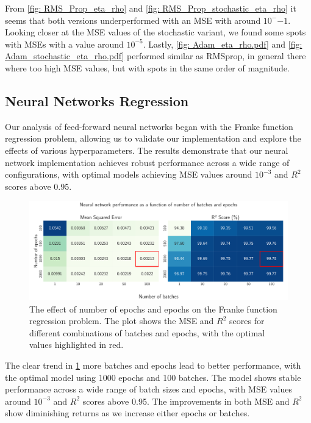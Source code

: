 From \cref{fig: RMS_Prop_eta_rho} and \cref{fig: RMS_Prop_stochastic_eta_rho} it seems that both versions underperformed with an MSE with around \( 10^-{-1} \). Looking closer at the MSE values of the stochastic variant, we found some spots with MSEs with a value around \( 10^{-5} \). Lastly, \cref{fig: Adam_eta_rho.pdf} and \cref{fig: Adam_stochastic_eta_rho.pdf} performed similar as RMSprop, in general there where too high MSE values, but with spots in the same order of magnitude.

\clearpage

\subsection{Neural Networks Regression}


Our analysis of feed-forward neural networks began with the Franke function regression problem, allowing us to validate our implementation and explore the effects of various hyperparameters. The results demonstrate that our neural network implementation achieves robust performance across a wide range of configurations, with optimal models achieving MSE values around \( 10^{-3} \) and \( R^2 \) scores above 0.95.


\begin{figure}[h!]
    \begin{minipage}{\textwidth}
        \centering
        \includegraphics[width = .9\textwidth]{../figs/c_batch_epoch.pdf}
        \caption{The effect of number of epochs and epochs on the Franke function regression problem. The plot shows the MSE and \( R^2 \) scores for different combinations of batches and epochs, with the optimal values highlighted in red.}
        \label{fig:NN_Franke_batch_epoch}
    \end{minipage}
\end{figure}

The clear trend in \cref{fig:NN_Franke_batch_epoch} more batches and epochs lead to better performance, with the optimal model using 1000 epochs and 100 batches. The model shows stable performance across a wide range of batch sizes and epochs, with MSE values around \( 10^{-3} \) and \( R^2 \) scores above 0.95. The improvements in both MSE and $R^2$ show diminishing returns as we increase either epochs or batches.


